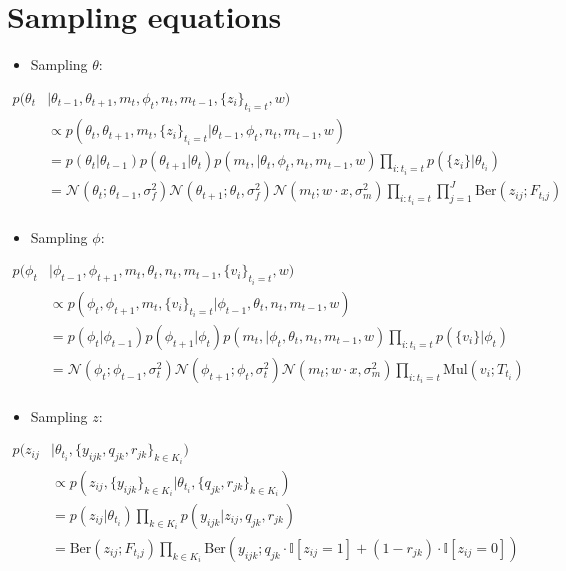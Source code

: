 \documentclass[11pt]{article}
\theoremstyle{plain}
\theoremstyle{definition}
\begin{document}
\section{Sampling equations}

\begin{itemize}
\item Sampling $\theta$:
\end{itemize}
\begin{align*}
p(\theta_t &| \theta_{t-1}, \theta_{t+1}, m_t, \phi_t, n_t, m_{t-1}, \{z_i\}_{t_i=t}, w) \\
&\propto p(\theta_t, \theta_{t+1}, m_t, \{z_i\}_{t_i=t}| \theta_{t-1}, \phi_t, n_t, m_{t-1}, w) \\
&= p(\theta_t | \theta_{t-1}) p(\theta_{t+1}|\theta_t) p(m_t, | \theta_t, \phi_t, n_t, m_{t-1}, w) \prod_{i : t_i = t} p(\{z_i\} | \theta_{t_i})  \\
&= \mathcal{N}(\theta_t ; \theta_{t-1}, \sigma_f^2)  \mathcal{N}(\theta_{t+1} ; \theta_{t}, \sigma_f^2) \mathcal{N}(m_t ; w \cdot x, \sigma_m^2) \prod_{i : t_i = t} \prod_{j=1}^J \textrm{Ber}(z_{ij} ; F_{t_i j} )  \\
\end{align*}

\begin{itemize}
\item Sampling $\phi$:
\end{itemize}
\begin{align*}
p(\phi_t &| \phi_{t-1}, \phi_{t+1}, m_t, \theta_t, n_t, m_{t-1}, \{v_i\}_{t_i=t}, w) \\
&\propto p(\phi_t, \phi_{t+1}, m_t, \{v_i\}_{t_i=t}| \phi_{t-1}, \theta_t, n_t, m_{t-1}, w) \\
&= p(\phi_t | \phi_{t-1}) p(\phi_{t+1}|\phi_t) p(m_t, | \phi_t, \theta_t, n_t, m_{t-1}, w) \prod_{i : t_i = t} p(\{v_i\} | \phi_{t})  \\
&= \mathcal{N}(\phi_t ; \phi_{t-1}, \sigma_t^2)  \mathcal{N}(\phi_{t+1} ; \phi_{t}, \sigma_t^2) \mathcal{N}(m_t ; w \cdot x, \sigma_m^2) \prod_{i : t_i = t} \textrm{Mul}(v_i ; T_{t_i} )  \\
\end{align*}

\begin{itemize}
\item Sampling $z$:
\end{itemize}
\begin{align*}
p(z_{ij} &| \theta_{t_i}, \{y_{ijk}, q_{jk}, r_{jk}\}_{k \in K_i}) \\
&\propto p(z_{ij}, \{y_{ijk}\}_{k \in K_i} | \theta_{t_i}, \{q_{jk}, r_{jk}\}_{k \in K_i}) \\
&= p(z_{ij} | \theta_{t_i}) \prod_{k \in K_i} p(y_{ijk} | z_{ij}, q_{jk}, r_{jk}) \\
&= \textrm{Ber}(z_{ij} ; F_{t_i j} ) \prod_{k \in K_i} \textrm{Ber}(y_{ijk} ; q_{jk} \cdot \mathbb{I}[z_{ij}=1] + (1-r_{jk}) \cdot \mathbb{I}[z_{ij}=0])\\
\end{align*}
\end{document}
